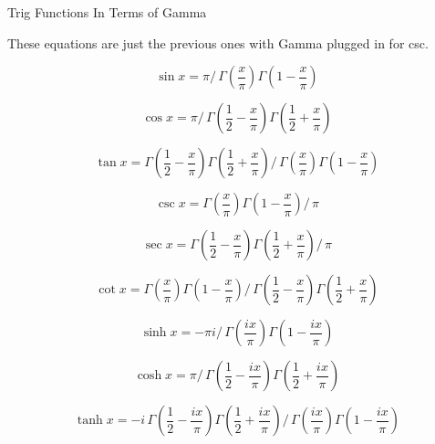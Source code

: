 \documentclass[12pt]{article}
\begin{document}
\pagebreak\begin{section}{Trig Functions In Terms of Gamma}
	
	\noindent These equations are just the previous ones with Gamma plugged in for csc.

	\begin{equation}\sin x=\pi\big/\,\Gamma\left(\dfrac x\pi\right)\Gamma\left(1-\dfrac x\pi\right)\end{equation}

	\begin{equation}
		\cos x=\pi\big/\,\Gamma\left(\dfrac12-\dfrac x\pi\right)\Gamma\left(\dfrac12+\dfrac x\pi\right)
	\end{equation}

	\begin{equation}
		\tan x=\Gamma\left(\dfrac12-\dfrac x\pi\right)\Gamma\left(\dfrac12+\dfrac x\pi\right)\big/\,\Gamma\left(\dfrac x\pi\right)\Gamma\left(1-\dfrac x\pi\right)
	\end{equation}
	
	\begin{equation}\csc x=\Gamma\left(\dfrac x\pi\right)\Gamma\left(1-\dfrac x\pi\right)\big/\,\pi\end{equation}

	\begin{equation}\sec x=\Gamma\left(\dfrac12-\dfrac x\pi\right)\Gamma\left(\dfrac12+\dfrac x\pi\right)\big/\,\pi\end{equation}

	\begin{equation}
		\cot x=\Gamma\left(\dfrac x\pi\right)\Gamma\left(1-\dfrac x\pi\right)\big/\,\Gamma\left(\dfrac12-\dfrac x\pi\right)\Gamma\left(\dfrac12+\dfrac x\pi\right)
	\end{equation}


	\begin{equation}\sinh x=-\pi i\big/\,\Gamma\left(\dfrac{ix}\pi\right)\Gamma\left(1-\dfrac{ix}\pi\right)\end{equation}

	\begin{equation}
		\cosh x=\pi\big/\,\Gamma\left(\dfrac12-\dfrac{ix}\pi\right)\Gamma\left(\dfrac12+\dfrac{ix}\pi\right)
	\end{equation}

	\begin{equation}
		\tanh x=-i\,\Gamma\left(\dfrac12-\dfrac{ix}\pi\right)\Gamma\left(\dfrac12+\dfrac{ix}\pi\right)\big/\,\Gamma\left(\dfrac{ix}\pi\right)\Gamma\left(1-\dfrac{ix}\pi\right)
	\end{equation}


\end{section}
\end{document}
